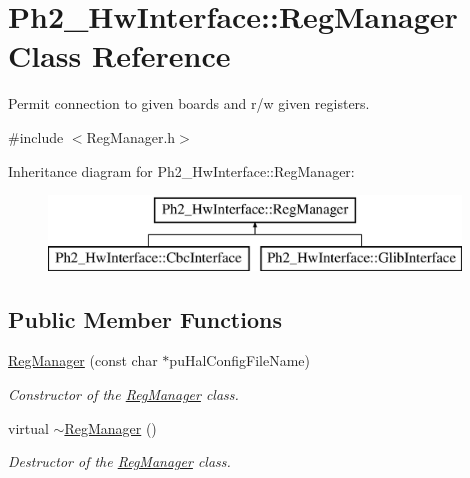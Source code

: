 \hypertarget{class_ph2___hw_interface_1_1_reg_manager}{\section{Ph2\-\_\-\-Hw\-Interface\-:\-:Reg\-Manager Class Reference}
\label{class_ph2___hw_interface_1_1_reg_manager}
}


Permit connection to given boards and r/w given registers.  




{\ttfamily \#include $<$Reg\-Manager.\-h$>$}

Inheritance diagram for Ph2\-\_\-\-Hw\-Interface\-:\-:Reg\-Manager\-:\begin{figure}[H]
\begin{center}
\leavevmode
\includegraphics[height=2.000000cm]{class_ph2___hw_interface_1_1_reg_manager}
\end{center}
\end{figure}
\subsection*{Public Member Functions}
\begin{DoxyCompactItemize}
\item 
\hyperlink{class_ph2___hw_interface_1_1_reg_manager_a938f6b582b1fffcb478f35fd9d81954f}{Reg\-Manager} (const char $\ast$pu\-Hal\-Config\-File\-Name)
\begin{DoxyCompactList}\small\item\em Constructor of the \hyperlink{class_ph2___hw_interface_1_1_reg_manager}{Reg\-Manager} class. \end{DoxyCompactList}\item 
virtual \hyperlink{class_ph2___hw_interface_1_1_reg_manager_a5d650c4e6467153f98f999abbbfc354c}{$\sim$\-Reg\-Manager} ()
\begin{DoxyCompactList}\small\item\em Destructor of the \hyperlink{class_ph2___hw_interface_1_1_reg_manager}{Reg\-Manager} class. \end{DoxyCompactList}\end{DoxyCompactItemize}

